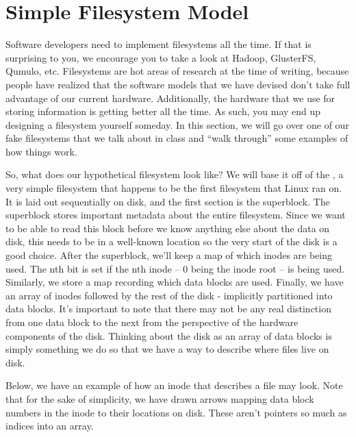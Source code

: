 \section{Simple Filesystem Model}

Software developers need to implement filesystems all the time.
If that is surprising to you, we encourage you to take a look at Hadoop, GlusterFS, Qumulo, etc.
Filesystems are hot areas of research at the time of writing, because people have realized that the software models that we have devised don't take full advantage of our current hardware.
Additionally, the hardware that we use for storing information is getting better all the time.
As such, you may end up designing a filesystem yourself someday.
In this section, we will go over one of our fake filesystems that we talk about in class and ``walk through'' some examples of how things work.

So, what does our hypothetical filesystem look like? 
We will base it off of the , a very simple filesystem that happens to be the first filesystem that Linux ran on.
It is laid out sequentially on disk, and the first section is the superblock.
The superblock stores important metadata about the entire filesystem.
Since we want to be able to read this block before we know anything else about the data on disk, this needs to be in a well-known location so the very start of the disk is a good choice.
After the superblock, we'll keep a map of which inodes are being used.
The nth bit is set if the nth inode -- $0$ being the inode root -- is being used.
Similarly, we store a map recording which data blocks are used.
Finally, we have an array of inodes followed by the rest of the disk - implicitly partitioned into data blocks.
It's important to note that there may not be any real distinction from one data block to the next from the perspective of the hardware components of the disk.
Thinking about the disk as an array of data blocks is simply something we do so that we have a way to describe where files live on disk.

Below, we have an example of how an inode that describes a file may look.
Note that for the sake of simplicity, we have drawn arrows mapping data block numbers in the inode to their locations on disk.
These aren't pointers so much as indices into an array.

